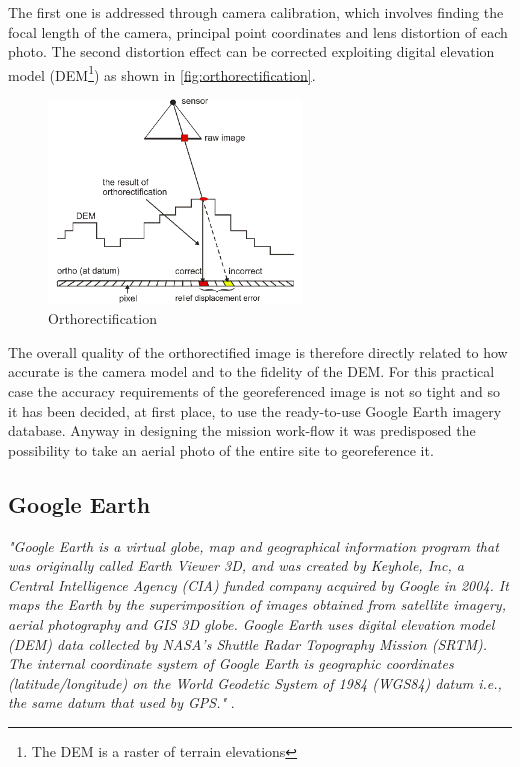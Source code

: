 The first one is addressed through camera calibration, which involves finding the focal length of the camera, principal point coordinates and lens distortion of each photo.
The second distortion effect can be corrected exploiting digital elevation model (DEM\footnote{The DEM is a raster of terrain elevations}) as shown in \autoref{fig:orthorectification}.
\begin{figure}[ht]
    \centering
    \includegraphics[width=0.6\textwidth]{figures/C2/Ortophoto.png}
    \caption{Orthorectification}
    \label{fig:orthorectification}
\end{figure}
The overall quality of the orthorectified image is therefore directly related to how accurate is the camera model and to the fidelity of the DEM. For this practical case the accuracy requirements of the georeferenced image is not so tight and so it has been decided, at first place, to use the ready-to-use Google Earth imagery database. Anyway in designing the mission work-flow it was predisposed the possibility to take an aerial photo of the entire site to georeference it.

\subsection{Google Earth} %
\label{ssec:orthophoto_database}

\textit{"Google Earth is a virtual globe, map and geographical information program that was originally called Earth Viewer 3D, and was created by Keyhole, Inc, a Central Intelligence Agency (CIA) funded company acquired by Google in 2004. It maps the Earth by the superimposition of images obtained from satellite imagery, aerial photography and GIS 3D globe. Google Earth uses digital elevation model (DEM) data collected by NASA's Shuttle Radar Topography Mission (SRTM). The internal coordinate system of Google Earth is geographic coordinates (latitude/longitude) on the World Geodetic System of 1984 (WGS84) datum i.e., the same datum that used by GPS."} \cite{PosAccuracyGE}.\\

